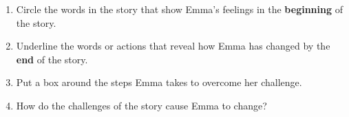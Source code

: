 \documentclass[12pt]{article}
\begin{document}
\vspace{1em}

\begin{tcolorbox}[colframe=black!60, colback=white, 
coltitle=black, colbacktitle=black!15, fonttitle=\bfseries\Large, 
title=Guided Practice, halign title=center, left=10pt, right=10pt, top=10pt, bottom=15pt]

\begin{enumerate}[itemsep=1em]
    \item Circle the words in the story that show Emma’s feelings in the \textbf{beginning }of the story.
    \item Underline the words or actions that reveal how Emma has changed by the \textbf{end} of the story.
    \item Put a box around the steps Emma takes to overcome her challenge.
    \item How do the challenges of the story cause Emma to change?
    \\[0.8cm] \underline{\hspace{14cm}}  
    \\[0.8cm] \underline{\hspace{14cm}}  
    \\[0.8cm] \underline{\hspace{14cm}} 
\end{enumerate}
\end{tcolorbox}

\vspace{1em}
\end{document}
